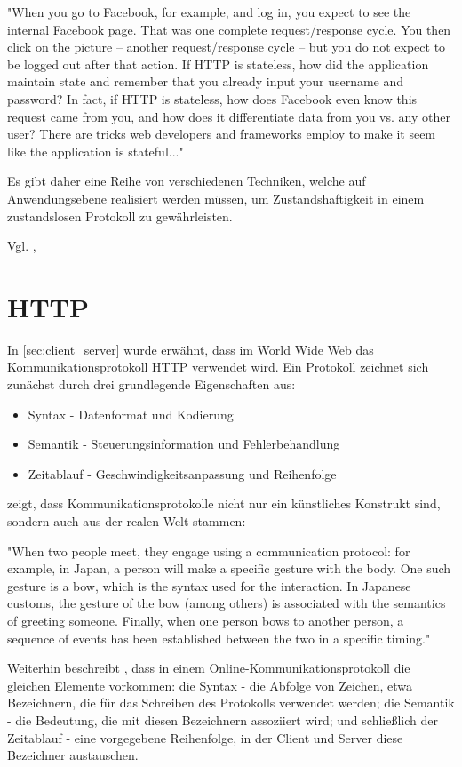 "When you go to Facebook, for example, and log in, you expect to see the internal Facebook page. That was one complete request/response cycle. You then click on the picture -- another request/response cycle -- but you do not expect to be logged out after that action. If HTTP is stateless, how did the application maintain state and remember that you already input your username and password? In fact, if HTTP is stateless, how does Facebook even know this request came from you, and how does it differentiate data from you vs. any other user? There are tricks web developers and frameworks employ to make it seem like the application is stateful..."

Es gibt daher eine Reihe von verschiedenen Techniken, welche auf Anwendungsebene realisiert werden müssen, um Zustandshaftigkeit in einem zustandslosen Protokoll zu gewährleisten.

Vgl. \cite[Background]{Parikh:2015}, \cite{Culloca:2006}

\section{HTTP}

In \ref{sec:client_server} wurde erwähnt, dass im World Wide Web das Kommunikationsprotokoll HTTP verwendet wird. Ein Protokoll zeichnet sich zunächst durch drei grundlegende Eigenschaften aus:

\begin{itemize}
\item Syntax - Datenformat und Kodierung
\item Semantik - Steuerungsinformation und Fehlerbehandlung
\item Zeitablauf - Geschwindigkeitsanpassung und Reihenfolge
\end{itemize}

\cite{Dubost:2012} zeigt, dass Kommunikationsprotokolle nicht nur ein künstliches Konstrukt sind, sondern auch aus der realen Welt stammen:

"When two people meet, they engage using a communication protocol: for example, in Japan, a person will make a specific gesture with the body. One such gesture is a bow, which is the syntax used for the interaction. In Japanese customs, the gesture of the bow (among others) is associated with the semantics of greeting someone. Finally, when one person bows to another person, a sequence of events has been established between the two in a specific timing."

Weiterhin beschreibt \cite{Dubost:2012}, dass in einem Online-Kommunikationsprotokoll die gleichen Elemente vorkommen: die Syntax - die Abfolge von Zeichen, etwa Bezeichnern, die für das Schreiben des Protokolls verwendet werden; die Semantik - die Bedeutung, die mit diesen Bezeichnern assoziiert wird; und schließlich der Zeitablauf - eine vorgegebene Reihenfolge, in der Client und Server diese Bezeichner austauschen.

